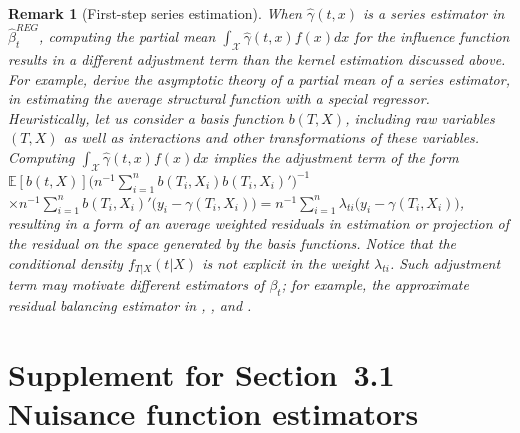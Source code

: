 \documentclass[lettersize, 12pt]{article}
\newtheorem{remark}{Remark}
\renewcommand{\thesection}{\arabic{section}}
\renewcommand{\theequation}{\arabic{section}.\arabic{equation}}
\begin{document}
{\begin{remark}[First-step series estimation]
{\rm 
When $\hat \gamma(t,x)$ is a series estimator in $\hat \beta_t^{REG}$, computing the partial mean $\int_\mathcal{X} \hat \gamma(t,x) f(x) dx$ for the influence function results in a different adjustment term than the kernel estimation discussed above.
For example, \cite{LeeLi} derive the asymptotic theory of a partial mean of a series estimator, in estimating the average structural function with a special regressor.
Heuristically, let us consider a basis function $b(T,X)$, including raw variables $(T,X)$ as well as interactions and other transformations of these variables.
Computing $\int_{\mathcal{X}} \hat \gamma(t, x) f(x) dx$ implies the adjustment term of the form
 $ \mathbb{E}[b(t,X)]\big( n^{-1}\sum_{i=1}^nb(T_i,X_i)b(T_i,X_i)' \big)^{-1}$
$\times n^{-1}\sum_{i=1}^n b(T_i, X_i)' \big(y_i - \gamma(T_i, X_i)\big) = n^{-1}\sum_{i=1}^n \lambda_{ti} \big(y_i - \gamma(T_i, X_i)\big)$, resulting in a form of an average weighted residuals in estimation or projection of the residual on the space generated by the basis functions. 
Notice that the conditional density $f_{T|X}(t|X)$ is not explicit in the weight $\lambda_{ti}$. 
Such adjustment term may motivate different estimators of $\beta_t$; for example, the approximate residual balancing estimator in \cite{AIW}, \cite{CEINR}, and \cite{DSLC}.


}\end{remark}








\section{Supplement for Section~3.1 Nuisance function estimators}
\label{ASec1stEst}



}
\end{document}
